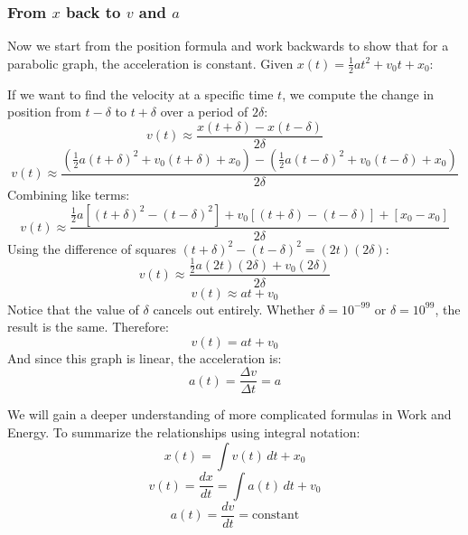 \documentclass[]{article}
\begin{document}
		\subsubsection*{From $x$ back to $v$ and $a$}
		Now we start from the position formula and work backwards to show that for a parabolic graph, the acceleration is constant.
		Given $x(t) = \frac{1}{2}at^2 + v_0t+x_0$:
		\begin{center}
		\end{center}
		If we want to find the velocity at a specific time $t$, we compute the change in position from $t-\delta$ to $t+\delta$ over a period of $2\delta$:
		 \[v(t)\approx \frac{x(t+\delta)-x(t-\delta)}{2\delta}\]
		 \[v(t)\approx \frac{\left(\frac{1}{2}a(t+\delta)^2 + v_0(t+\delta) + x_0\right)-
		 				 \left(\frac{1}{2}a(t-\delta)^2 + v_0(t-\delta)+x_0\right)}{2\delta}\]
	 	Combining like terms:
	 	\[v(t)\approx \frac{\frac{1}{2}a\left[(t+\delta)^2-
	 		(t-\delta)^2\right] + v_0\left[(t+\delta)-(t-\delta)\right]+\left[x_0-x_0\right]}{2\delta}\]
		Using the difference of squares $(t+\delta)^2 - (t-\delta)^2 = (2t)(2\delta)$:
		 \[v(t) \approx \frac{\frac{1}{2}a(2t)(2\delta) + v_0(2\delta)}{2\delta}\]
		\[v(t) \approx at+v_0\]
		Notice that the value of $\delta$ cancels out entirely. Whether $\delta = 10^{-99}$ or $\delta = 10^{99}$, the result is the same. Therefore:
		\[v(t) = at+v_0\]
		And since this graph is linear, the acceleration is:
		\[a(t) = \frac{\Delta v}{\Delta t} = a\]
		
		We will gain a deeper understanding of more complicated formulas in Work and Energy. To summarize the relationships using integral notation:
		\[x(t) = \int v(t)\,dt + x_0\]
		\[v(t) = \frac{dx}{dt} = \int a(t)\,dt + v_0\]
		\[a(t) = \frac{dv}{dt} = \text{constant}\]
		
\end{document}
